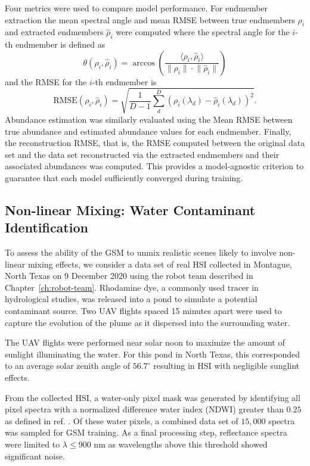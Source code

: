 Four metrics were used to compare model performance. For endmember extraction
the mean spectral angle and mean RMSE between true endmembers $\rho_i$ and
extracted endmembers $\hat{\rho}_i$ were computed where the spectral angle for
the $i$-th endmember is defined as
\begin{equation}
    \theta(\rho_i, \hat{\rho}_i) =  \arccos\left( \dfrac{\langle \rho_i, \hat{\rho}_i \rangle}{\lVert \rho_i \rVert \cdot \lVert \hat{\rho}_i \rVert}\right)
\end{equation}
and the RMSE for the $i$-th endmember is
\begin{equation}
    \text{RMSE}(\rho_i, \hat{\rho}_i) = \sqrt{\frac{1}{D-1}\sum_d^D\left(\rho_i(\lambda_d) - \hat{\rho}_i(\lambda_d) \right)^2}.
\end{equation}
Abundance estimation was similarly evaluated using the Mean RMSE between true
abundance and estimated abundance values for each endmember. Finally, the
reconstruction RMSE, that is, the RMSE computed between the original data set
and the data set reconstructed via the extracted endmembers and their associated
abundances was computed. This provides a model-agnostic criterion to guarantee
that each model sufficiently converged during training.

\subsection{Non-linear Mixing: Water Contaminant Identification}\label{sec:real-experiments}

To assess the ability of the GSM to unmix realistic scenes likely to involve
non-linear mixing effects, we consider a data set of real HSI collected in
Montague, North Texas on 9 December 2020 using the robot team described in
Chapter~\ref{ch:robot-team}. Rhodamine dye, a commonly used tracer in
hydrological studies, was released into a pond to simulate a potential
contaminant source. Two UAV flights spaced 15 minutes apart were used to capture
the evolution of the plume as it dispersed into the surrounding water.

The UAV flights were performed near solar noon to maximize the amount of
sunlight illuminating the water. For this pond in North Texas, this corresponded
to an average solar zenith angle of $56.7^{\circ}$ resulting in HSI with
negligible sunglint effects.

From the collected HSI, a water-only pixel mask was generated by identifying all
pixel spectra with a normalized difference water index (NDWI) greater than
$0.25$ as defined in ref. \cite{ndwi}. Of these water pixels, a combined data
set of $15,000$ spectra was sampled for GSM training. As a final processing
step, reflectance spectra were limited to $\lambda \leq 900$ nm as wavelengths
above this threshold showed significant noise.

